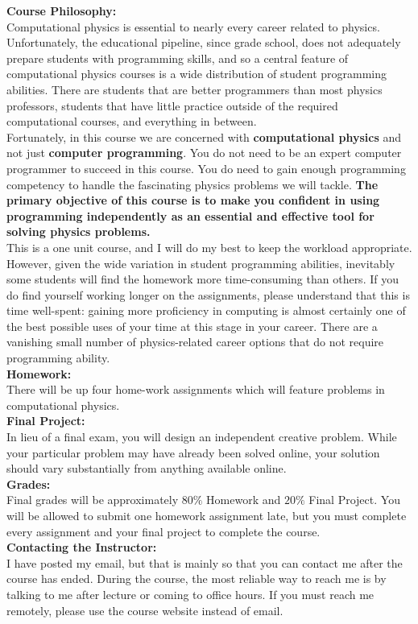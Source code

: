 \documentclass[12pt]{article}
\begin{document}
\noindent
\textbf {Course Philosophy:}\\
Computational physics is essential to nearly every career related to
physics.  Unfortunately, the educational pipeline, since grade school,
does not adequately prepare students with programming skills, and so a
central feature of computational physics courses is a wide
distribution of student programming abilities.  There are students
that are better programmers than most physics professors, students
that have little practice outside of the required computational
courses, and everything in between.\\[3pt]

\noindent
Fortunately, in this course we are concerned with {\bf computational
  physics} and not just {\bf computer programming}.  You do not need
to be an expert computer programmer to succeed in this course. You do
need to gain enough programming competency to handle the fascinating
physics problems we will tackle.  {\bf The primary objective of this
  course is to make you confident in using programming independently
  as an essential and effective tool for solving physics
  problems.}\\[3pt]

\noindent
This is a one unit course, and I will do my best to keep the workload
appropriate.  However, given the wide variation in student programming
abilities, inevitably some students will find the homework more
time-consuming than others.  If you do find yourself working longer on
the assignments, please understand that this is time well-spent:
gaining more proficiency in computing is almost certainly one of the
best possible uses of your time at this stage in your career.  There
are a vanishing small number of physics-related career options that do
not require programming ability.\\[3pt]

\noindent
\textbf{Homework:}\\  There will be up four home-work assignments which
will feature problems in computational physics.\\[3pt]

\noindent
\textbf{Final Project:}\\ In lieu of a final exam, you will design an
independent creative problem.  While your particular problem may have
already been solved online, your solution should vary substantially
from anything available online.\\[3pt]

\noindent
\textbf {Grades:}\\
Final grades will be approximately $80\%$ Homework and $20\%$ Final
Project.  You will be allowed to submit one homework assignment late,
but you must complete every assignment and your final project to
complete the course.\\

\noindent
\textbf {Contacting the Instructor:}\\
I have posted my email, but that is mainly so that you can contact me
after the course has ended.  During the course, the most reliable way
to reach me is by talking to me after lecture or coming to office
hours.  If you must reach me remotely, please use the course website
instead of email.
\end{document}
